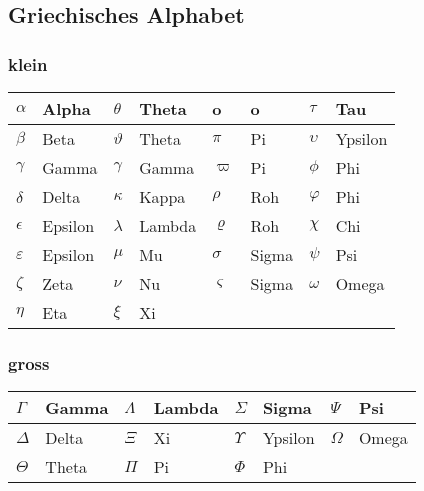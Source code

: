 \subsection{Griechisches Alphabet}
\begin{multicols}{2}
	\subsubsection{klein}
	\begin{tabular}{ |l|l|l|l|l|l|l|l|}
		\hline
		$\alpha$&Alpha&$\theta$&Theta&o&o&$\tau$&Tau\\
		\hline
		$\beta$&Beta&$\vartheta$&Theta&$\pi$&Pi&$\upsilon$&Ypsilon\\
		\hline
		$\gamma$&Gamma&$\gamma$&Gamma&$\varpi$&Pi&$\phi$&Phi\\
		\hline
		$\delta$&Delta&$\kappa$&Kappa&$\rho$&Roh&$\varphi$&Phi\\
		\hline
		$\epsilon$&Epsilon&$\lambda$&Lambda&$\varrho$&Roh&$\chi$&Chi\\
		\hline
		$\varepsilon$&Epsilon&$\mu$&Mu&$\sigma$&Sigma&$\psi$&Psi\\
		\hline
		$\zeta$&Zeta&$\nu$&Nu&$\varsigma$&Sigma&$\omega$&Omega\\
		\hline
		$\eta$&Eta&$\xi$&Xi&&&&\\
		\hline
	\end{tabular}
	\columnbreak
	
	\subsubsection{gross}
	\begin{tabular}{|l|l|l|l|l|l|l|l|}
		\hline
		$\Gamma$&Gamma&$\Lambda$&Lambda&$\Sigma$&Sigma&$\Psi$&Psi\\
		\hline
		$\Delta$&Delta&$\Xi$&Xi&$\Upsilon$&Ypsilon&$\Omega$&Omega\\
		\hline
		$\Theta$&Theta&$\Pi$&Pi&$\Phi$&Phi&&\\
		\hline
	\end{tabular}
\end{multicols}